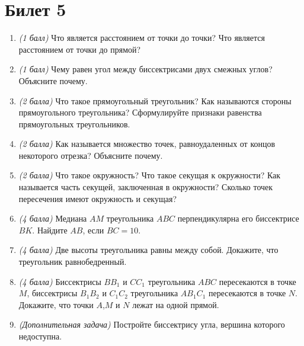 \documentclass[12pt, a4paper]{article}
\begin{document}
\section*{Билет 5}
\begin{enumerate}
\item \textit{(1 балл)} Что является расстоянием от точки до точки? Что является расстоянием от точки до прямой?
\item \textit{(1 балл)} Чему равен угол между биссектрисами двух смежных углов? Объясните почему.
\item \textit{(2 балла)} Что такое прямоугольный треугольник? Как называются стороны прямоугольного треугольника? Сформулируйте признаки равенства прямоугольных треугольников.
\item \textit{(2 балла)} Как называется множество точек, равноудаленных от концов некоторого отрезка? Объясните почему.
\item \textit{(2 балла)} Что такое окружность? Что такое секущая к окружности? Как называется часть секущей, заключенная в окружности? Сколько точек пересечения имеют окружность и секущая?
\item \textit{(4 балла)} Медиана $AM$ треугольника $ABC$ перпендикулярна его биссектрисе $BK$. Найдите $AB$, если $BC = 10$.
\item \textit{(4 балла)} Две высоты треугольника равны между собой. Докажите, что треугольник равнобедренный.
\item \textit{(4 балла)} Биссектрисы $BB_1$ и $CC_1$ треугольника $ABC$ пересекаются в точке $M$, биссектрисы $B_1B_2$ и $C_1C_2$ треугольника $AB_1C_1$ пересекаются в точке $N$. Докажите, что точки $A$,$M$ и $N$ лежат на одной прямой.
\item \textit{(Дополнительная задача)} Постройте биссектрису угла, вершина которого недоступна.
\end{enumerate}
\end{document}
